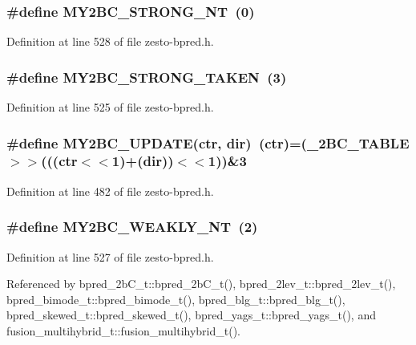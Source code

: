 \subsubsection[{MY2BC\_\-STRONG\_\-NT}]{\setlength{\rightskip}{0pt plus 5cm}\#define MY2BC\_\-STRONG\_\-NT~(0)}\label{zesto-bpred_8h_5c85ac4938b8aaad4098261c61881d62}




Definition at line 528 of file zesto-bpred.h.
\subsubsection[{MY2BC\_\-STRONG\_\-TAKEN}]{\setlength{\rightskip}{0pt plus 5cm}\#define MY2BC\_\-STRONG\_\-TAKEN~(3)}\label{zesto-bpred_8h_391b33a37cdf2ef70dbe9d7e18755b71}




Definition at line 525 of file zesto-bpred.h.
\subsubsection[{MY2BC\_\-UPDATE}]{\setlength{\rightskip}{0pt plus 5cm}\#define MY2BC\_\-UPDATE(ctr, \/  dir)~(ctr)=(\_\-2BC\_\-TABLE$>$$>$(((ctr$<$$<$1)+(dir))$<$$<$1))\&3}\label{zesto-bpred_8h_0282d44b09c8be75d9ab177af9ebb2fe}




Definition at line 482 of file zesto-bpred.h.
\subsubsection[{MY2BC\_\-WEAKLY\_\-NT}]{\setlength{\rightskip}{0pt plus 5cm}\#define MY2BC\_\-WEAKLY\_\-NT~(2)}\label{zesto-bpred_8h_b9b4f68a03c03f93301c736ec88227be}




Definition at line 527 of file zesto-bpred.h.

Referenced by bpred\_\-2bC\_\-t::bpred\_\-2bC\_\-t(), bpred\_\-2lev\_\-t::bpred\_\-2lev\_\-t(), bpred\_\-bimode\_\-t::bpred\_\-bimode\_\-t(), bpred\_\-blg\_\-t::bpred\_\-blg\_\-t(), bpred\_\-skewed\_\-t::bpred\_\-skewed\_\-t(), bpred\_\-yags\_\-t::bpred\_\-yags\_\-t(), and fusion\_\-multihybrid\_\-t::fusion\_\-multihybrid\_\-t().
